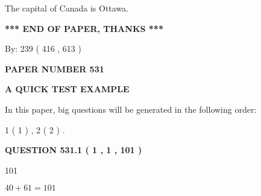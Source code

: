 \documentclass[12pt]{article}
\begin{document}
 
The capital of Canada is Ottawa.
 
 
 
 
   
   
 \vspace{0.2in}
 
   
   
   
   
\vspace{1.0in} 
{\textbf{\large{ *** END OF PAPER, THANKS *** }}} 
   
   
\hspace{1.0in} By: 
 239 ( 416 ,  613 )
   
   
   
   
\newpage 
\setcounter{page}{ 
   531001 } 
   
   
   
   
 {\textbf{ \Large{ PAPER NUMBER  531  }}}
   
   
\vspace{0.2in}
   
   
   
   
   
   
 \vspace{0.2in}
{\LARGE {\textbf{ A QUICK TEST EXAMPLE}}}
   
   
   
\vspace{0.2in}
   
In this paper, big questions will be generated in the following order: 
   
   
   1 ( 1 )
 ,
   2 ( 2 )
 .
  
\vspace{0.2in}
  
{\textbf{\Large{QUESTION
531.1 
 ( 1 , 1 , 101 )
}}}
  
  
 
 
\noindent{}

101
 
 
 
 
\noindent{}

$ %
40 +  %
61=   %
101$
 
 
  
\vspace{0.2in}
  
\end{document}
